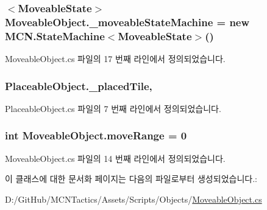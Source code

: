 \subsubsection[{\texorpdfstring{\+\_\+moveable\+State\+Machine}{_moveableStateMachine}}]{$<${\bf Moveable\+State}$>$ Moveable\+Object.\+\_\+moveable\+State\+Machine = new {\bf M\+C\+N.\+State\+Machine}$<${\bf Moveable\+State}$>$()\hspace{0.3cm}{\ttfamily [private]}}\hypertarget{class_moveable_object_a3abd653cd978a7bdbb391a4c86f7d75f}{}\label{class_moveable_object_a3abd653cd978a7bdbb391a4c86f7d75f}


Moveable\+Object.\+cs 파일의 17 번째 라인에서 정의되었습니다.

\subsubsection[{\texorpdfstring{\+\_\+placed\+Tile}{_placedTile}}]{ Placeable\+Object.\+\_\+placed\+Tile\hspace{0.3cm}{\ttfamily [protected]}, {\ttfamily [inherited]}}\hypertarget{class_placeable_object_a0fd0566f0bb15c71b0630322762342d8}{}\label{class_placeable_object_a0fd0566f0bb15c71b0630322762342d8}


Placeable\+Object.\+cs 파일의 7 번째 라인에서 정의되었습니다.

\subsubsection[{\texorpdfstring{move\+Range}{moveRange}}]{\setlength{\rightskip}{0pt plus 5cm}int Moveable\+Object.\+move\+Range = 0\hspace{0.3cm}{\ttfamily [private]}}\hypertarget{class_moveable_object_a5453d85915073df751887c9ca9480405}{}\label{class_moveable_object_a5453d85915073df751887c9ca9480405}


Moveable\+Object.\+cs 파일의 14 번째 라인에서 정의되었습니다.



이 클래스에 대한 문서화 페이지는 다음의 파일로부터 생성되었습니다.\+:\begin{DoxyCompactItemize}
\item 
D\+:/\+Git\+Hub/\+M\+C\+N\+Tactics/\+Assets/\+Scripts/\+Objects/\hyperlink{_moveable_object_8cs}{Moveable\+Object.\+cs}\end{DoxyCompactItemize}

